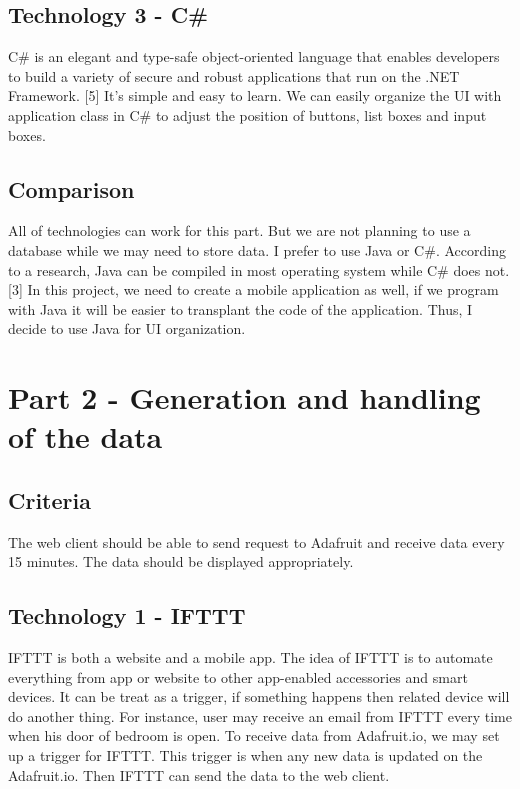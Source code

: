 \documentclass[10pt,onecolumn,journal,draftclsnofoot]{IEEEtran}
\begin{document}
	\subsection{Technology 3 - C\#}
    \par 
    C\# is an elegant and type-safe object-oriented language that enables developers to build a variety of secure and robust applications that run on the .NET Framework. [5] It’s simple and easy to learn. We can easily organize the UI with application class in C\# to adjust the position of buttons, list boxes and input boxes.
    \subsection{Comparison}
    \par 
    All of technologies can work for this part. But we are not planning to use a database while we may need to store data. I prefer to use Java or C\#. According to a research, Java can be compiled in most operating system while C\# does not. [3] In this project, we need to create a mobile application as well, if we program with Java it will be easier to transplant the code of the application. Thus, I decide to use Java for UI organization.

	\section{Part 2 - Generation and handling of the data}
	\subsection{Criteria}
	\par The web client should be able to send request to Adafruit and receive data every 15 minutes. The data should be displayed appropriately.
	
	\subsection{Technology 1 - IFTTT}
	\par
	IFTTT is both a website and a mobile app. The idea of IFTTT is to automate everything from app or website to other app-enabled accessories and smart devices. It can be treat as a trigger, if something happens then related device will do another thing. For instance, user may receive an email from IFTTT every time when his door of bedroom is open. To receive data from Adafruit.io, we may set up a trigger for IFTTT. This trigger is when any new data is updated on the Adafruit.io. Then IFTTT can send the data to the web client.
\end{document}
